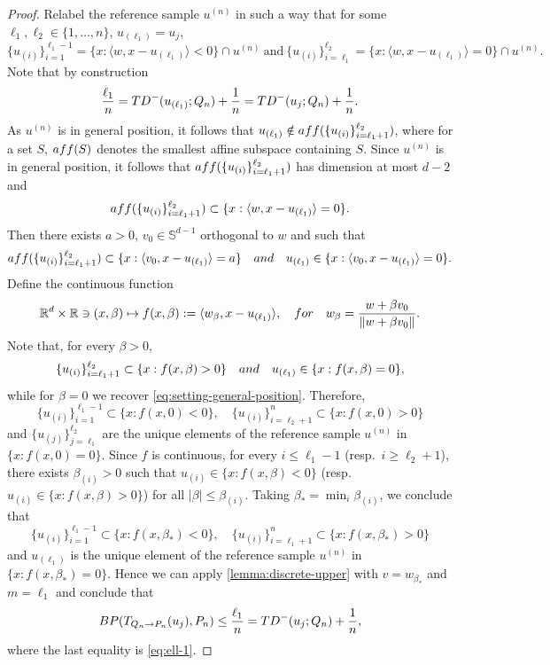 \documentclass[10pt,a4paper]{amsart}
\newcommand{\R}{\RR}
\newcommand{\RR}{\mathbb{R}}
\begin{document}
\begin{proof}
 Relabel the reference sample $u^{(n)}$ in such a way that for some ${\ell}_1,\ell_2\in \{1, \dots, n\}$,  $u_{(\ell_1)}= u_j$,
\begin{equation}
    \label{eq:setting-general-position}
     \{u_{(i)}\}_{i=1}^{\ell_1-1}= \{ x: \langle w, x-u_{(\ell_1)}\rangle < 0\} \cap u^{(n)} \ \text{and}\   \{u_{(i)}\}_{i=\ell_1}^{\ell_2}= \{ x: \langle w, x-u_{(\ell_1)}\rangle =  0\} \cap u^{(n)}.
\end{equation}
%
Note that by construction
%
\begin{equation}
    \label{eq:ell-1}
   \frac{ \ell_1}{n}=  {\rm TD}^{-}(u_{(\ell_1)};Q_n)+\frac{1}{n}=  {\rm TD}^{-}(u_j;Q_n)+\frac{1}{n}.
\end{equation}
%
 As $u^{(n)}$ is in general position, it follows that $ u_{(\ell_1)}\notin {\rm aff}( \{u_{(i)}\}_{i=\ell_1+1}^{\ell_2})$, where for a set $S$,   ${\rm aff}(S)$  denotes the smallest affine subspace containing $S$. Since  $u^{(n)}$ is in general position,  it follows that ${\rm aff}( \{u_{(i)}\}_{i=\ell_1+1}^{\ell_2})$ has  dimension  at most $d-2$ and  
 $$ {\rm aff}( \{u_{(i)}\}_{i=\ell_1+1}^{\ell_2})\subset  \{ x: \langle w, x-u_{(\ell_1)}\rangle =  0\}. $$ 
 Then there exists $a>0$,  $v_0 \in \mathbb{S}^{d-1} $ orthogonal to $ w$ and such that 
$$ {\rm aff}(\{u_{(i)}\}_{i=\ell_1+1}^{\ell_2})\subset \{  x: \langle  v_0,x-u_{(\ell_1)}  \rangle =a \} \quad {\rm and}\quad u_{(\ell_1)} \in \{  x: \langle v_0, x -u_{(\ell_1)} \rangle =0 \} . $$
%
Define the continuous function 
%
$$ \R^d\times \R \ni (x,\beta)\mapsto f(x,\beta):= \langle    w_\beta, x -u_{(\ell_1)} \rangle, \quad {\rm for }\quad  w_\beta =\frac{w+ \beta v_0}{\|w+ \beta v_0\|}.   $$
%
Note that, for every $\beta>0$, 
%
$$ \{u_{(i)}\}_{i=\ell_1+1}^{\ell_2} \subset  \{  x: f(x,\beta) >0  \} \quad {\rm and}\quad  u_{(\ell_1)} \in \{  x: f(x,\beta) =0  \}, $$
%
while for $\beta=0$ we recover \eqref{eq:setting-general-position}. Therefore,
%
$$ \{u_{(i)}\}_{i=1}^{\ell_1-1} \subset  \{  x: f(x,0) <0  \},  \quad \{u_{(i)}\}_{i=\ell_2+1}^{n} \subset  \{  x: f(x,0)>0  \} $$ 
%
and $ \{u_{(j)}\}_{j=\ell_1}^{\ell_2}$ are the unique elements of the reference sample $u^{(n)}$ in $\{  x: f(x,0) =0  \}$. Since $f$ is continuous, for every $i\leq \ell_1-1$ (resp.~$i\geq \ell_2+1$), there exists $\beta_{(i)}>0$ such that   $u_{(i)} \in \{  x: f(x,\beta) <0  \} $ (resp.~$u_{(i)} \in \{  x: f(x,\beta) >0  \} $) for all $|\beta|\leq \beta_{(i)}$. Taking $\beta_*=\min_{i} \beta_{(i)}$, we conclude that 
%
$$ \{u_{(i)}\}_{i=1}^{\ell_1-1} \subset  \{  x: f(x,\beta_*) <0  \},  \quad  \{u_{(i)}\}_{i=\ell_1+1}^{n} \subset  \{  x: f(x,\beta_*) >0  \}  $$
%
 and $ u_{(\ell_1)}$ is the unique element of the reference sample $u^{(n)}$ in $\{  x: f(x,\beta_*) =0  \}$. Hence we can apply \cref{lemma:discrete-upper} with $v=w_{\beta_*}$ and $m= \ell_1$ and conclude that 
$$  {\rm BP}({ T}_{Q_n\to P_n}(u_j), P_n) \leq  
\frac{\ell_1}{n}={\rm TD}^{-}(u_j;Q_n)+\frac{1}{n}, $$
where the last equality is \eqref{eq:ell-1}. 

\end{proof}
\end{document}
